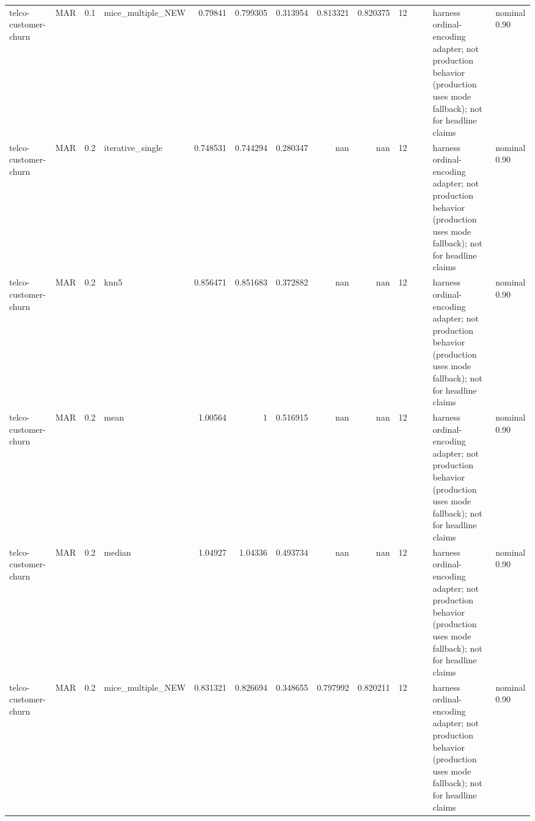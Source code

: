 \begin{table}[ht]
\begin{tabular}{llrlrrrrrrllll}
 telco-customer-churn & MAR         &         0.1 & mice\_multiple\_NEW &       0.79841  &             0.799305 &                 0.313954 &                       0.813321 &                         0.820375 &        12 &                    &                                         & harness ordinal-encoding adapter; not production behavior (production uses mode fallback); not for headline claims & nominal 0.90              \\
 telco-customer-churn & MAR         &         0.2 & iterative\_single  &       0.748531 &             0.744294 &                 0.280347 &                     nan        &                       nan        &        12 &                    &                                         & harness ordinal-encoding adapter; not production behavior (production uses mode fallback); not for headline claims & nominal 0.90              \\
 telco-customer-churn & MAR         &         0.2 & knn5              &       0.856471 &             0.851683 &                 0.372882 &                     nan        &                       nan        &        12 &                    &                                         & harness ordinal-encoding adapter; not production behavior (production uses mode fallback); not for headline claims & nominal 0.90              \\
 telco-customer-churn & MAR         &         0.2 & mean              &       1.00564  &             1        &                 0.516915 &                     nan        &                       nan        &        12 &                    &                                         & harness ordinal-encoding adapter; not production behavior (production uses mode fallback); not for headline claims & nominal 0.90              \\
 telco-customer-churn & MAR         &         0.2 & median            &       1.04927  &             1.04336  &                 0.493734 &                     nan        &                       nan        &        12 &                    &                                         & harness ordinal-encoding adapter; not production behavior (production uses mode fallback); not for headline claims & nominal 0.90              \\
 telco-customer-churn & MAR         &         0.2 & mice\_multiple\_NEW &       0.831321 &             0.826694 &                 0.348655 &                       0.797992 &                         0.820211 &        12 &                    &                                         & harness ordinal-encoding adapter; not production behavior (production uses mode fallback); not for headline claims & nominal 0.90              \\

\end{tabular}
\end{table}
